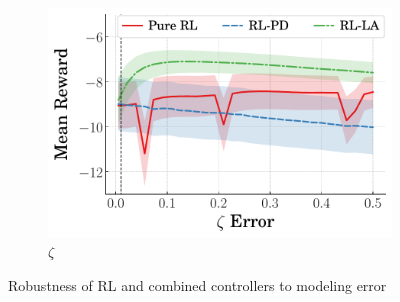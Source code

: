 \begin{figure}[t]
\begin{subfigure}[b]{0.49\textwidth}
        \includegraphics[width=\textwidth]{figures/figures_robustness/duffing_robustness/zeta_robustness.pdf}
        \caption{$\zeta$}
        \label{subfig_chap4:duffing_zeta_robustness}
    \end{subfigure}
       \caption{Robustness of RL and combined controllers to modeling error}
       \label{fig_chap4:duffing_robustness}
\end{figure}
%
